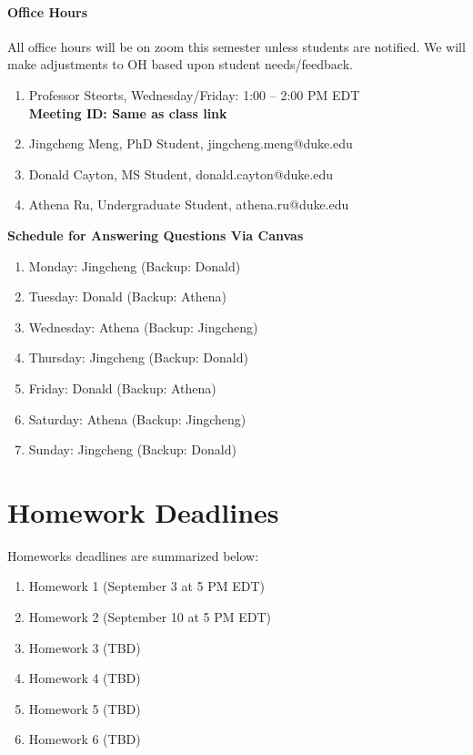 \documentclass[11pt]{article}
\begin{document}
\paragraph{Office Hours}
All office hours will be on zoom this semester unless students are notified. We will make adjustments to OH based upon student needs/feedback. 
\begin{enumerate}
\item Professor Steorts, Wednesday/Friday: 1:00 -- 2:00 PM EDT \\
\textbf{Meeting ID: Same as class link}
\item Jingcheng Meng, PhD Student, jingcheng.meng@duke.edu\\
\item Donald Cayton, MS Student, donald.cayton@duke.edu\\
\item Athena Ru, Undergraduate Student, athena.ru@duke.edu \\ 
\end{enumerate}


\textbf{Schedule for Answering Questions Via Canvas}
\begin{enumerate}
\item Monday: Jingcheng (Backup: Donald)
\item Tuesday: Donald (Backup: Athena)
\item Wednesday: Athena (Backup: Jingcheng)
\item Thursday: Jingcheng (Backup: Donald)
\item Friday: Donald (Backup: Athena)
\item Saturday: Athena (Backup: Jingcheng)
\item Sunday: Jingcheng (Backup: Donald)
\end{enumerate}



\section{Homework Deadlines}
Homeworks deadlines are summarized below:

\begin{enumerate}
\item Homework 1 (September 3 at 5 PM EDT)
\item Homework 2 (September 10 at 5 PM EDT)
\item Homework 3 (TBD)
\item Homework 4 (TBD)
\item Homework 5 (TBD)
\item Homework 6 (TBD)
\end{enumerate} 
\end{document}
